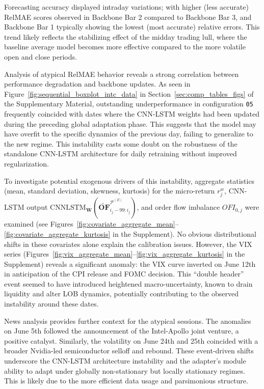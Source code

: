\documentclass[10pt,a4paper,oneside]{article}
\begin{document}
Forecasting accuracy displayed intraday variations; with higher (less accurate) RelMAE scores observed in Backbone Bar 2 compared to Backbone Bar 3, and Backbone Bar 1 typically showing the lowest (most accurate) relative errors. This trend likely reflects the stabilizing effect of the midday trading lull, where the baseline average model becomes more effective compared to the more volatile open and close periods.

Analysis of atypical RelMAE behavior reveals a strong correlation between performance degradation and backbone updates. As seen in Figure~\ref{fig:sequential_boxplot_intc_data} in Section~\ref{sec:comp_tables_figs} of the Supplementary Material, outstanding underperformance in configuration \texttt{05} frequently coincided with dates where the CNN-LSTM weights had been updated during the preceding global adaptation phase. This suggests that the model may have overfit to the specific dynamics of the previous day, failing to generalize to the new regime. This instability casts some doubt on the robustness of the standalone CNN-LSTM architecture for daily retraining without improved regularization.

To investigate potential exogenous drivers of this instability, aggregate statistics (mean, standard deviation, skewness, kurtosis) for the micro-return $r^w_j$, CNN-LSTM output $\mathrm{CNNLSTM}_{\mathbf{W}}\!\left(\widetilde{\mathbf{OF}}^{\mathcal{P}^{(E)}}_{i_{j}-99:i_{j}}\right)$, and order flow imbalance $OFI_{0, j}$ were examined (see Figures~\ref{fig:covariate_aggregate_mean}--\ref{fig:covariate_aggregate_kurtosis} in the Supplement). No obvious distributional shifts in these covariates alone explain the calibration issues. However, the VIX series (Figures~\ref{fig:vix_aggregate_mean}--\ref{fig:vix_aggregate_kurtosis} in the Supplement) reveals a significant anomaly: the VIX curve inverted on June 12th in anticipation of the CPI release and FOMC decision. This ``double header'' event seemed to have introduced heightened macro-uncertainty, known to drain liquidity and alter LOB dynamics, potentially contributing to the observed instability around these dates.

News analysis provides further context for the atypical sessions. The anomalies on June 5th followed the announcement of the Intel-Apollo joint venture, a positive catalyst. Similarly, the volatility on June 24th and 25th coincided with a broader Nvidia-led semiconductor selloff and rebound. These event-driven shifts underscore the CNN-LSTM architecture instability and the adapter's module ability to adapt under globally non-stationary but locally stationary regimes. This is likely due to the more efficient data usage and parsimonious structure.
\end{document}
